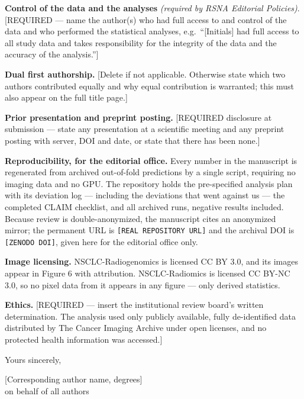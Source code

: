 \documentclass[11pt]{article}
\begin{document}
\textbf{Control of the data and the analyses} \textit{(required by RSNA Editorial
Policies)}. [REQUIRED --- name the author(s) who had full access to and control of
the data and who performed the statistical analyses, e.g.\ ``[Initials] had full
access to all study data and takes responsibility for the integrity of the data
and the accuracy of the analysis.'']

\textbf{Dual first authorship.} [Delete if not applicable. Otherwise state which
two authors contributed equally and why equal contribution is warranted; this must
also appear on the full title page.]

\textbf{Prior presentation and preprint posting.} [REQUIRED disclosure at
submission --- state any presentation at a scientific meeting and any preprint
posting with server, DOI and date, or state that there has been none.]

\medskip
\textbf{Reproducibility, for the editorial office.} Every number in the
manuscript is regenerated from archived out-of-fold predictions by a single
script, requiring no imaging data and no GPU. The repository holds the
pre-specified analysis plan with its deviation log --- including the deviations
that went against us --- the completed CLAIM checklist, and all archived runs,
negative results included. Because review is double-anonymized, the manuscript
cites an anonymized mirror; the permanent URL is \texttt{[REAL REPOSITORY URL]}
and the archival DOI is \texttt{[ZENODO DOI]}, given here for the editorial office
only.

\textbf{Image licensing.} NSCLC-Radiogenomics is licensed CC BY 3.0, and its
images appear in Figure 6 with attribution. NSCLC-Radiomics is licensed CC BY-NC
3.0, so no pixel data from it appears in any figure --- only derived statistics.

\textbf{Ethics.} [REQUIRED --- insert the institutional review board's written
determination. The analysis used only publicly available, fully de-identified data
distributed by The Cancer Imaging Archive under open licenses, and no protected
health information was accessed.]

\vspace{1.2em}
Yours sincerely,

\vspace{2.5em}
{}[Corresponding author name, degrees] \\
on behalf of all authors
\end{document}
